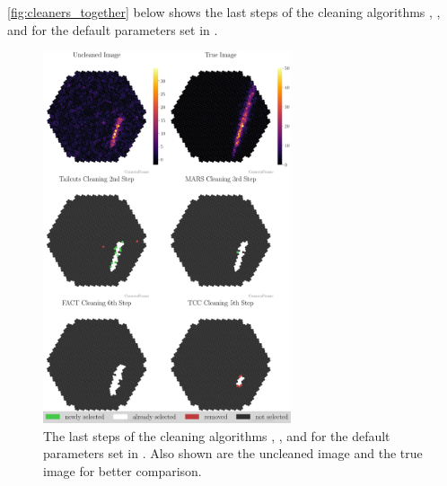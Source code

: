 \autoref{fig:cleaners_together} below shows the last steps of the cleaning algorithms \tailcuts{}, \mars{}, \fact{} and \tcc{}
for the default parameters set in \ctapipe{}.

\begin{figure}
    \centering
    \includegraphics[width=0.65\textwidth]{plots/cleaner_steps/last_steps.pdf}
    \caption{The last steps of the cleaning algorithms \tailcuts{}, \mars{}, \fact{} and \tcc{} for the default
    parameters set in \ctapipe{}. Also shown are the uncleaned image and the true image for better comparison.}
    \label{fig:cleaners_together}
\end{figure}
